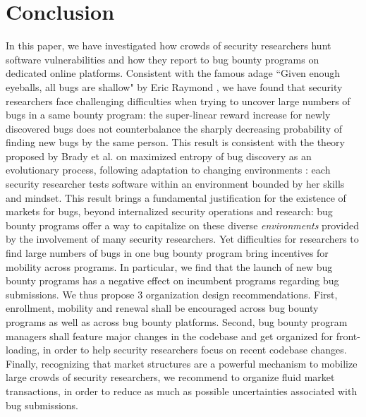 \section{Conclusion}
\label{sec:conclusion}
In this paper, we have investigated how crowds of security researchers hunt software vulnerabilities and how they report to bug bounty programs on dedicated online platforms. Consistent with the famous adage ``Given enough eyeballs, all bugs are shallow" by Eric Raymond \cite{raymond1999cathedral}, we have found that security researchers face challenging difficulties when trying to uncover large numbers of bugs in a same bounty program: the super-linear reward increase for newly discovered bugs does not counterbalance the sharply decreasing probability of finding new bugs by the same person. This result is consistent with the theory proposed by Brady et al. on maximized entropy of bug discovery as an evolutionary process, following adaptation to changing environments \cite{brady1999murphy}: each security researcher tests software within an environment bounded by her skills and mindset. This result brings a fundamental justification for the existence of markets for bugs, beyond internalized security operations and research: bug bounty programs offer a way to capitalize on these diverse {\it environments} provided by the involvement of many security researchers. Yet difficulties for researchers to find large numbers of bugs in one bug bounty program bring incentives for mobility across programs. In particular, we find that the launch of new bug bounty programs has a negative effect on incumbent programs regarding bug submissions. We thus propose 3 organization design recommendations. First, enrollment, mobility and renewal shall be encouraged across bug bounty programs as well as across bug bounty platforms. Second, bug bounty program managers shall feature major changes in the codebase and get organized for front-loading, in order to help security researchers focus on recent codebase changes. Finally, recognizing that market structures are a powerful mechanism to mobilize large crowds of security researchers, we recommend to organize fluid market transactions, in order to reduce as much as possible uncertainties associated with bug submissions.



